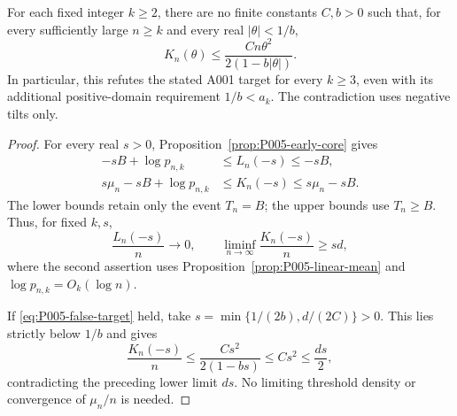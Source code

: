 \begin{theorem}
\label{thm:P005-target-refuted}
For each fixed integer $k\ge2$, there are no finite constants $C,b>0$
such that, for every sufficiently large $n\ge k$ and every real
$|\theta|<1/b$,
\begin{equation}
 K_n(\theta)\le\frac{Cn\theta^2}{2(1-b|\theta|)}.
 \label{eq:P005-false-target}
\end{equation}
In particular, this refutes the stated A001 target for every $k\ge3$,
even with its additional positive-domain requirement $1/b<a_k$.
The contradiction uses negative tilts only.
\end{theorem}
\begin{proof}
For every real $s>0$, Proposition~\ref{prop:P005-early-core} gives
\begin{align}
 -sB+\log p_{n,k}
 &\le L_n(-s)\le -sB,\label{eq:P005-negative-uncentered}\\
 s\mu_n-sB+\log p_{n,k}
 &\le K_n(-s)\le s\mu_n-sB.
 \label{eq:P005-negative-centered}
\end{align}
The lower bounds retain only the event $T_n=B$; the upper bounds
use $T_n\ge B$. Thus, for fixed $k,s$,
\[
 \frac{L_n(-s)}n\longrightarrow0,\qquad
 \liminf_{n\to\infty}\frac{K_n(-s)}n\ge sd,
\]
where the second assertion uses Proposition~\ref{prop:P005-linear-mean}
and $\log p_{n,k}=O_k(\log n)$.

If \eqref{eq:P005-false-target} held, take
$s=\min\{1/(2b),d/(2C)\}>0$. This lies strictly below $1/b$ and gives
\[
 \frac{K_n(-s)}n
 \le\frac{Cs^2}{2(1-bs)}\le Cs^2\le\frac{ds}{2},
\]
contradicting the preceding lower limit $ds$. No limiting threshold
density or convergence of $\mu_n/n$ is needed.
\end{proof}

